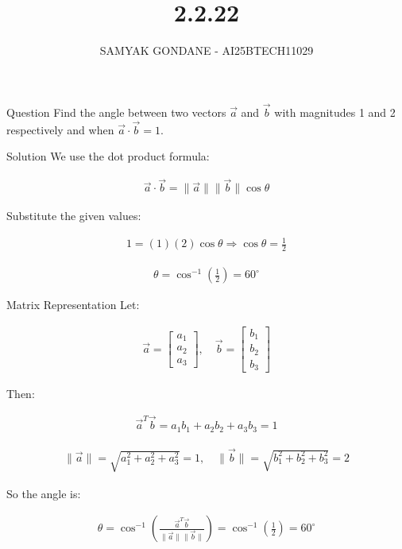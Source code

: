 \documentclass{beamer}
\title 
{2.2.22}
\date{}
\author
{SAMYAK GONDANE - AI25BTECH11029}
\begin{document}
\frame{\titlepage}

\begin{frame}{Question}
Find the angle between two vectors $\vec{a}$ and $\vec{b}$ with magnitudes 1 and 2 respectively and when $\vec{a} \cdot \vec{b} = 1$.
\end{frame}

\begin{frame}{Solution}
We use the dot product formula:


\begin{align}
\vec{a} \cdot \vec{b} = \|\vec{a}\| \|\vec{b}\| \cos\theta
\end{align}


Substitute the given values:


\begin{align}
1 = (1)(2)\cos\theta \Rightarrow \cos\theta = \frac{1}{2}
\end{align}




\begin{align}
\theta = \cos^{-1}\left(\frac{1}{2}\right) = 60^\circ
\end{align}


\end{frame}

\begin{frame}{Matrix Representation}
Let:


\begin{align}
\vec{a} = \begin{bmatrix} a_1 \\ a_2 \\ a_3 \end{bmatrix}, \quad
\vec{b} = \begin{bmatrix} b_1 \\ b_2 \\ b_3 \end{bmatrix}
\end{align}


Then:


\begin{align}
\vec{a}^T \vec{b} = a_1b_1 + a_2b_2 + a_3b_3 = 1
\end{align}




\begin{align}
\|\vec{a}\| = \sqrt{a_1^2 + a_2^2 + a_3^2} = 1, \quad
\|\vec{b}\| = \sqrt{b_1^2 + b_2^2 + b_3^2} = 2
\end{align}


So the angle is:


\begin{align}
\theta = \cos^{-1}\left(\frac{\vec{a}^T \vec{b}}{\|\vec{a}\| \|\vec{b}\|}\right)
= \cos^{-1}\left(\frac{1}{2}\right) = 60^\circ
\end{align}


\end{frame}
\end{document}
